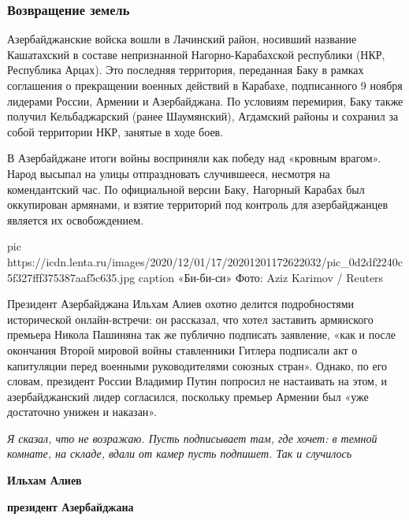  
 
 
 
 
\subsubsection{Возвращение земель}

Азербайджанские войска вошли в Лачинский район, носивший название Кашатахский в
составе непризнанной Нагорно-Карабахской республики (НКР, Республика Арцах).
Это последняя территория, переданная Баку в рамках соглашения о прекращении
военных действий в Карабахе, подписанного 9 ноября лидерами России, Армении и
Азербайджана. По условиям перемирия, Баку также получил Кельбаджарский (ранее
Шаумянский), Агдамский районы и сохранил за собой территории НКР, занятые в
ходе боев.

В Азербайджане итоги войны восприняли как победу над «кровным врагом». Народ
высыпал на улицы отпраздновать случившееся, несмотря на комендантский час. По
официальной версии Баку, Нагорный Карабах был оккупирован армянами, и взятие
территорий под контроль для азербайджанцев является их освобождением.

\ifcmt
pic https://icdn.lenta.ru/images/2020/12/01/17/20201201172622032/pic_0d2df2240c5f327fff375387aaf5c635.jpg
caption «Би-би-си» Фото: Aziz Karimov / Reuters 
\fi

Президент Азербайджана Ильхам Алиев охотно делится подробностями исторической
онлайн-встречи: он рассказал, что хотел заставить армянского премьера Никола
Пашиняна так же публично подписать заявление, «как и после окончания Второй
мировой войны ставленники Гитлера подписали акт о капитуляции перед военными
руководителями союзных стран». Однако, по его словам, президент России Владимир
Путин попросил не настаивать на этом, и азербайджанский лидер согласился,
поскольку премьер Армении был «уже достаточно унижен и наказан».

\begin{leftbar}
\emph{Я сказал, что не возражаю. Пусть подписывает там, где хочет: в темной комнате,
на складе, вдали от камер пусть подпишет. Так и случилось}\par
				\textbf{Ильхам Алиев}\par
				\textbf{президент Азербайджана}\par
\end{leftbar}

